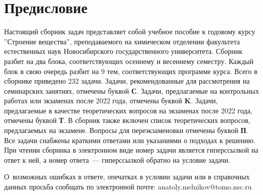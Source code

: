 \footnotesize

\chapter*{Предисловие}

Настоящий сборник задач представляет собой учебное пособие к годовому курсу ''Строение вещества'', преподаваемого на химическом отделении факультета естественных наук Новосибирского государственного университета. Сборник разбит на два блока, соответствующих осеннему и весеннему семестру. Каждый блок в свою очередь разбит на 9 тем, соответствующих программе курса. Всего в сборнике приведено 232 задачи. Задачи, рекомендованные для рассмотрения на семинарских занятиях, отмечены буквой \textbf{С}. Задачи, предлагаемые на контрольных работах или экзаменах после 2022 года, отмечены буквой \textbf{K}. Задачи, предлагаемые в качестве теоретических вопросов на экзаменах после 2022 года, отмечены буквой \textbf{Т}. В сборник также включен список теоретических вопросов, предлагаемых на экзамене. Вопросы для переэкзаменовки отмечены буквой \textbf{П}. Все задачи снабжены краткими ответами или указаниями о подходах к решению. При чтении сборника в электронном виде номер задачи является гиперссылкой на ответ к ней, а номер ответа~--- гиперссылкой обратно на условие задачи.

О~возможных ошибках в ответе, опечатках в условии задачи или в справочных данных просьба сообщать по электронной почте: anatoly.melnikov@tomo.nsc.ru 

